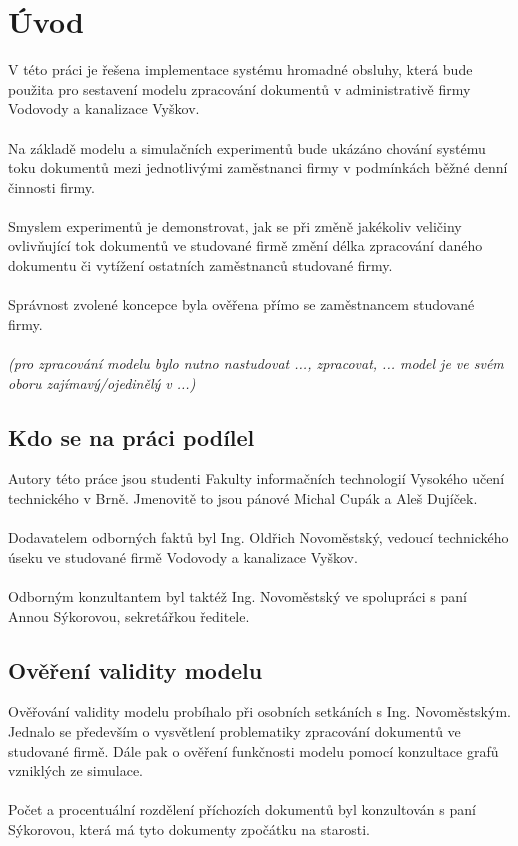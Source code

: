 \documentclass[a4paper]{article}
\begin{document}


\thispagestyle{empty}
\tableofcontents
\newpage

\section{Úvod}
V této práci je řešena implementace systému hromadné obsluhy, která bude použita pro 
sestavení modelu zpracování dokumentů v administrativě firmy Vodovody a kanalizace Vyškov.\\
\\
Na základě modelu a simulačních experimentů bude ukázáno 
chování systému toku dokumentů mezi jednotlivými zaměstnanci firmy v podmínkách běžné denní činnosti firmy.\\ 
\\
Smyslem experimentů je demonstrovat, jak se při změně jakékoliv veličiny ovlivňující tok dokumentů ve studované firmě změní délka zpracování daného dokumentu či vytížení ostatních zaměstnanců studované firmy.\\
\\
Správnost zvolené koncepce byla ověřena přímo se zaměstnancem studované firmy.\\
\\
\textit{(pro zpracování modelu bylo nutno nastudovat ..., zpracovat, ... model je ve svém oboru zajímavý/ojedinělý v ...)}

\subsection{Kdo se na práci podílel}
Autory této práce jsou studenti Fakulty informačních technologií Vysokého učení technického v Brně. Jmenovitě to jsou pánové Michal Cupák a Aleš Dujíček.\\
\\
Dodavatelem odborných faktů byl Ing. Oldřich Novoměstský, vedoucí technického úseku ve studované firmě Vodovody a kanalizace Vyškov.\\
\\
Odborným konzultantem byl taktéž Ing. Novoměstský ve spolupráci s paní Annou Sýkorovou, sekretářkou ředitele.

\subsection{Ověření validity modelu}
Ověřování validity modelu probíhalo při osobních setkáních s Ing. Novoměstským. Jednalo se především o vysvětlení problematiky zpracování dokumentů ve studované firmě. Dále pak o ověření funkčnosti modelu pomocí konzultace grafů vzniklých ze simulace.\\
\\
Počet a procentuální rozdělení příchozích dokumentů byl konzultován s paní Sýkorovou, která má tyto dokumenty zpočátku na starosti.
\end{document}
